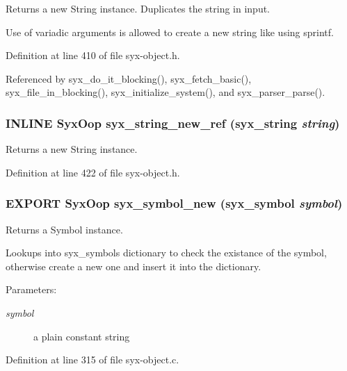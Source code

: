 Returns a new String instance. Duplicates the string in input.

Use of variadic arguments is allowed to create a new string like using sprintf. 

Definition at line 410 of file syx-object.h.

Referenced by syx\_\-do\_\-it\_\-blocking(), syx\_\-fetch\_\-basic(), syx\_\-file\_\-in\_\-blocking(), syx\_\-initialize\_\-system(), and syx\_\-parser\_\-parse().\hypertarget{syx-object_8h_014aa4f99148b5e1a79b34553f022a59}{
\subsubsection{\setlength{\rightskip}{0pt plus 5cm}INLINE {\bf SyxOop} syx\_\-string\_\-new\_\-ref ({\bf syx\_\-string} {\em string})}}
\label{syx-object_8h_014aa4f99148b5e1a79b34553f022a59}


Returns a new String instance. 

Definition at line 422 of file syx-object.h.\hypertarget{syx-object_8h_66d94b213daa6f81d344a80f6449c0ea}{
\subsubsection{\setlength{\rightskip}{0pt plus 5cm}EXPORT {\bf SyxOop} syx\_\-symbol\_\-new ({\bf syx\_\-symbol} {\em symbol})}}
\label{syx-object_8h_66d94b213daa6f81d344a80f6449c0ea}


Returns a Symbol instance.

Lookups into syx\_\-symbols dictionary to check the existance of the symbol, otherwise create a new one and insert it into the dictionary. \begin{Desc}
\item[Parameters:]
\begin{description}
\item[{\em symbol}]a plain constant string \end{description}
\end{Desc}


Definition at line 315 of file syx-object.c.

